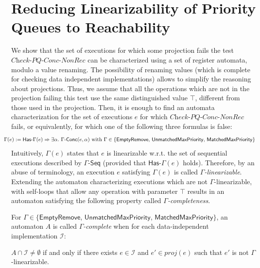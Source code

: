 \section{Reducing Linearizability of Priority Queues to Reachability}
\label{sec:co-regular of extended priority queues}

We show that the set of executions for which some projection fails the test $\textit{Check-PQ-Conc-NonRec}$ can be characterized using a set of register automata, modulo a value renaming. The possibility of renaming values (which is complete for checking data independent implementations) allows to simplify the reasoning about projections. Thus, we assume that all the operations which are not in the projection failing this test use the same distinguished value $\top$, different from those used in the projection. Then, it is enough to find an automata characterization for the set of executions $e$ for which $\textit{Check-PQ-Conc-NonRec}$ fails, or equivalently, for which one
of the following three formulas is false:
\begin{align*}
\hspace{-5mm}
\Gamma(e) := \mathsf{Has\text{-}}\Gamma(e) \Rightarrow \exists \alpha.\ \Gamma\mathsf{\text{-}Conc}(e,\alpha)\mbox{ with $\Gamma\in \{\mathsf{EmptyRemove}$, $\mathsf{UnmatchedMaxPriority}$, $\mathsf{MatchedMaxPriority}\}$}
\end{align*}
Intuitively, $\Gamma(e)$ states that $e$ is linearizable w.r.t. the set of sequential executions described by $\Gamma\mathsf{\text{-}Seq}$ (provided that $\mathsf{Has\text{-}}\Gamma(e)$ holds). Therefore, by an abuse of terminology, an execution $e$ satisfying $\Gamma(e)$ is called \emph{$\Gamma$-linearizable}.
Extending the automaton characterizing executions which are not $\Gamma$-linearizable, with self-loops that allow any operation with parameter $\top$ results in an automaton satisfying the following property called \emph{$\Gamma$-completeness}.

\begin{definition}
For $\Gamma\in \{\mathsf{EmptyRemove}$, $\mathsf{UnmatchedMaxPriority}$, $\mathsf{MatchedMaxPriority}\}$, an automaton $A$ is called \emph{$\Gamma$-complete} when for each data-independent implementation $\mathcal{I}$:

$A \cap \mathcal{I} \neq \emptyset$ if and only if there exists $ e \in \mathcal{I}$ and $e' \in \textit{proj}(e)$ such that $e'$ is not $\Gamma$-linearizable.
\end{definition}

